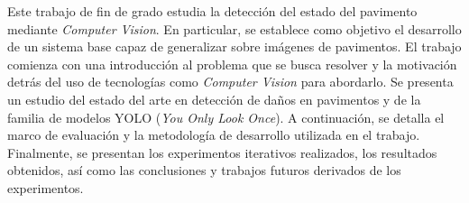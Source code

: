 
Este trabajo de fin de grado estudia la detección del estado del pavimento mediante \textit{Computer Vision}. En particular, se establece como objetivo el desarrollo de un sistema base capaz de generalizar sobre imágenes de pavimentos. El trabajo comienza con una introducción al problema que se busca resolver y la motivación detrás del uso de tecnologías como \textit{Computer Vision} para abordarlo. Se presenta un estudio del estado del arte en detección de daños en pavimentos y de la familia de modelos YOLO (\textit{You Only Look Once}). A continuación, se detalla el marco de evaluación y la metodología de desarrollo utilizada en el trabajo. Finalmente, se presentan los experimentos iterativos realizados, los resultados obtenidos, así como las conclusiones y trabajos futuros derivados de los experimentos.

